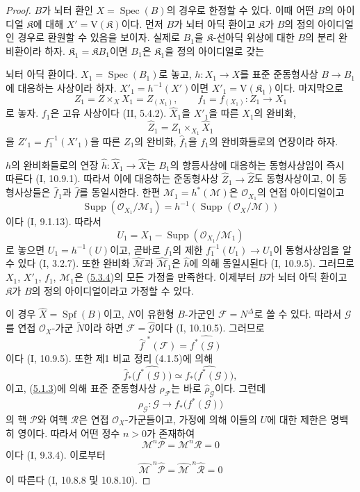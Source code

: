\begin{proof}
$B$가 뇌터 환인 $X=\operatorname{Spec}(B)$의 경우로 한정할 수
있다. 이때 어떤 $B$의 아이디얼 $\mathfrak K$에 대해
$X'=\mathrm V(\mathfrak K)$이다. 먼저 $B$가 뇌터 아딕 환이고
$\mathfrak K$가 $B$의 정의 아이디얼인 경우로 환원할 수 있음을
보이자. 실제로 $B_1$을 $\mathfrak K$-선아딕 위상에 대한 $B$의
분리 완비환이라 하자. $\mathfrak K_1=\mathfrak K B_1$이면
$B_1$은 $\mathfrak K_1$을 정의 아이디얼로 갖는


뇌터 아딕 환이다. $X_1=\operatorname{Spec}(B_1)$로 놓고,
$h:X_1\to X$를 표준 준동형사상 $B\to B_1$에 대응하는 사상이라
하자. $X'_1=h^{-1}(X')$이면
$X'_1=\mathrm V(\mathfrak K_1)$이다. 마지막으로
\[
Z_1=Z\times_X X_1=Z_{(X_1)},\qquad
f_1=f_{(X_1)}:Z_1\to X_1
\]
로 놓자. $f_1$은 고유 사상이다 (II, 5.4.2). $\widehat X_1$을
$X'_1$을 따른 $X_1$의 완비화,
\[
\widehat Z_1=Z_1\times_{X_1}\widehat X_1
\]
을 $Z'_1=f_1^{-1}(X'_1)$을 따른 $Z_1$의 완비화,
$\widehat f_1$을 $f_1$의 완비화들로의 연장이라 하자.

$h$의 완비화들로의 연장
$\widehat h:\widehat X_1\to\widehat X$는 $B_1$의 항등사상에
대응하는 동형사상임이 즉시 따른다 (I, 10.9.1). 따라서 이에
대응하는 준동형사상 $\widehat Z_1\to\widehat Z$도
동형사상이고, 이 동형사상들은 $\widehat f_1$과
$\widehat f$를 동일시한다. 한편
$\mathcal M_1=h^*(\mathcal M)$은 $\mathcal O_{X_1}$의 연접
아이디얼이고
\[
\operatorname{Supp}(\mathcal O_{X_1}/\mathcal M_1)
=h^{-1}(\operatorname{Supp}(\mathcal O_X/\mathcal M))
\]
이다 (I, 9.1.13). 따라서
\[
U_1=X_1-\operatorname{Supp}(\mathcal O_{X_1}/\mathcal M_1)
\]
로 놓으면 $U_1=h^{-1}(U)$이고, 곧바로 $f_1$의 제한
$f_1^{-1}(U_1)\to U_1$이 동형사상임을 알 수 있다
(I, 3.2.7). 또한 완비화 $\widehat{\mathcal M}$과
$\widehat{\mathcal M}_1$은 $\widehat h$에 의해 동일시된다
(I, 10.9.5). 그러므로 $X_1$, $X'_1$, $f_1$, $\mathcal M_1$은
(\hyperref[III.5.3.4-fr]{5.3.4})의 모든 가정을 만족한다. 이제부터
$B$가 뇌터 아딕 환이고 $\mathfrak K$가 $B$의 정의 아이디얼이라고
가정할 수 있다.

이 경우 $\widehat X=\operatorname{Spf}(B)$이고,
$N$이 유한형 $B$-가군인 $\mathcal F=N^\Delta$로 쓸 수 있다.
따라서 $\mathcal G$를 연접 $\mathcal O_X$-가군
$\widetilde N$이라 하면
$\mathcal F=\widehat{\mathcal G}$이다 (I, 10.10.5). 그러므로
\[
\widehat f^{,*}(\mathcal F)=\widehat{f^*(\mathcal G)}
\]
이다 (I, 10.9.5). 또한 제1 비교 정리 (4.1.5)에 의해
\[
\widehat f_*\bigl(\widehat{f^*(\mathcal G)}\bigr)
\simeq\widehat{f_*\bigl(f^*(\mathcal G)\bigr)},
\]
이고, (\hyperref[III.5.1.3-fr]{5.1.3})에 의해 표준 준동형사상
$\rho_{\mathcal F}$는 바로 $\widehat{\rho}_{\mathcal G}$이다.
그런데
\[
\rho_{\mathcal G}:\mathcal G\longrightarrow
f_*\bigl(f^*(\mathcal G)\bigr)
\]
의 핵 $\mathcal P$와 여핵 $\mathcal R$은 연접
$\mathcal O_X$-가군들이고, 가정에 의해 이들의 $U$에 대한 제한은
명백히 영이다. 따라서 어떤 정수 $n>0$가 존재하여
\[
\mathcal M^n\mathcal P=\mathcal M^n\mathcal R=0
\]
이다 (I, 9.3.4). 이로부터
\[
\widehat{\mathcal M}^{,n}\widehat{\mathcal P}=
\widehat{\mathcal M}^{,n}\widehat{\mathcal R}=0
\]
이 따른다 (I, 10.8.8 및 10.8.10).
\end{proof}

